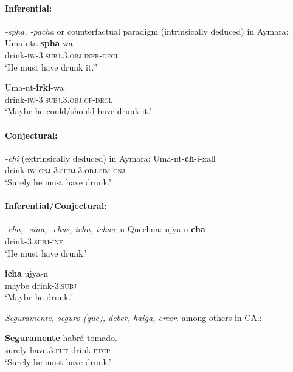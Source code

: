 \documentclass[output=paper,hidelinks]{langscibook}
\begin{document}
\paragraph*{Inferential:}


\ea
\textit{-spha, -pacha} or counterfactual paradigm (intrinsically deduced) in Aymara:
\ea \label{ex:infer.Aym1}
\gll Uma-nta-\textbf{spha}-wa \\
drink-\textsc{iw-3.subj.3.obj.infr-decl} \\ 
\glt ‘He must have drunk it.’’ 

\ex \label{ex:infer.Aym2}
\gll Uma-nt-\textbf{irki}-wa \\
drink\textsc{-iw-3.subj.3.obj.cf-decl} \\
\glt ‘Maybe he could/should
have drunk it.’
\z
\z


\paragraph*{Conjectural:}


 \ea \label{ex:conjecturalAym}
\textit{-chi} (extrinsically deduced) in Aymara:
\gll Uma-nt-\textbf{ch}-i-xall \\
drink-\textsc{iw-cnj-3.subj.3.obj.sim-cnj} \\ 
\glt `Surely he must have
drunk.' 
\z
 
\newpage
\paragraph*{Inferential/Conjectural:}



\ea \label{ex:infer.Quechua1}
\textit{-cha, -sina, -chus, icha, ichas} in Quechua:
\ea
\gll ujya-n-\textbf{cha} \\
drink-\textsc{3.subj-inf} \\ 
\glt `He must have drunk.'

\ex \label{ex:infer.Quechua2}
\gll \textbf{icha} ujya-n \\
maybe drink-\textsc{3.subj} \\ 
\glt `Maybe he drunk.'
\z
\z

\ea \label{ex:infer.CA1}
\textit{Seguramente, seguro
(que), deber, haiga, creer},
among others in CA.:

\ea
\gll \textbf{Seguramente} habrá
tomado. \\
surely have.3.\textsc{fut} drink.\textsc{ptcp} \\ 
\glt ‘Surely he must have
drunk.’ 
\end{document}
